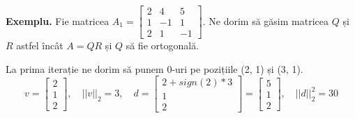 \documentclass{exam}
\begin{document}
\textbf{Exemplu.} Fie matricea $A_1 = \begin{bmatrix} 2 & 4 & 5 \\ 1 & -1 & 1 \\ 2 & 1 & -1 \end{bmatrix}$.
Ne dorim să găsim matricea $Q$ și $R$ astfel încât $A = QR$ și $Q$ să fie ortogonală.

La prima iterație ne dorim să punem 0-uri pe pozițiile (2, 1) și (3, 1).
\begin{equation*}
	v = \begin{bmatrix} 2 \\ 1 \\ 2 \end{bmatrix}, \quad ||v||_2 = 3, \quad d = \begin{bmatrix} 2 + sign(2) * 3 \\ 1 \\ 2 \end{bmatrix} = \begin{bmatrix} 5 \\ 1 \\ 2 \end{bmatrix}, \quad ||d||_2^2 = 30
\end{equation*}
\end{document}

